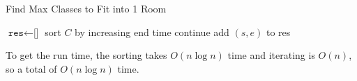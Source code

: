 \begin{example}
    \begin{algorithm}[H]
      \caption{Find Max Classes to Fit into 1 Room}
      \label{alg:class1}
      \begin{algorithmic}
          \State $\texttt{res} \gets \texttt{[]}$ 
          \State sort $C$ by increasing end time
             
              \State continue
            \EndIf
            \State add $(s, e)$ to res 
          \EndFor
          \State {}
        \EndFunction
      \end{algorithmic}
    \end{algorithm}
    To get the run time, the sorting takes $O(n \log{n})$ time and iterating is $O(n)$, so a total of $O(n \log{n})$ time. 
  \end{example}


